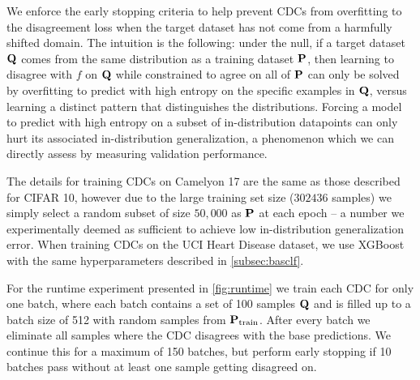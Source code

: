 We enforce the early stopping criteria to help prevent CDCs from overfitting to the disagreement loss when the target dataset has not come from a harmfully shifted domain.
The intuition is the following: under the null, if a target dataset $\mathbf{Q}$ comes from the same distribution as a training dataset $\mathbf{P}$, then learning to disagree with $f$ on $\mathbf{Q}$ while constrained to agree on all of $\mathbf{P}$ can only be solved by overfitting to predict with high entropy on the specific examples in $\mathbf{Q}$, versus learning a distinct pattern that distinguishes the distributions.
Forcing a model to predict with high entropy on a subset of in-distribution datapoints can only hurt its associated in-distribution generalization, a phenomenon which we can directly assess by measuring validation performance.

The details for training CDCs on Camelyon 17 are the same as those described for CIFAR 10, however due to the large training set size ($302436$ samples) we simply select a random subset of size $50,000$ as $\mathbf{P}$ at each epoch -- a number we experimentally deemed as sufficient to achieve low in-distribution generalization error.
When training CDCs on the UCI Heart Disease dataset, we use XGBoost~\citep{xgb} with the same hyperparameters described in \autoref{subsec:basclf}.

For the runtime experiment presented in \autoref{fig:runtime} we train each CDC for only one batch, where each batch contains a set of 100 samples $\mathbf{Q}$ and is filled up to a batch size of 512 with random samples from $\mathbf{P}_{\text{train}}$.
After every batch we eliminate all samples where the CDC disagrees with the base predictions.
We continue this for a maximum of 150 batches, but perform early stopping if 10 batches pass without at least one sample getting disagreed on.

